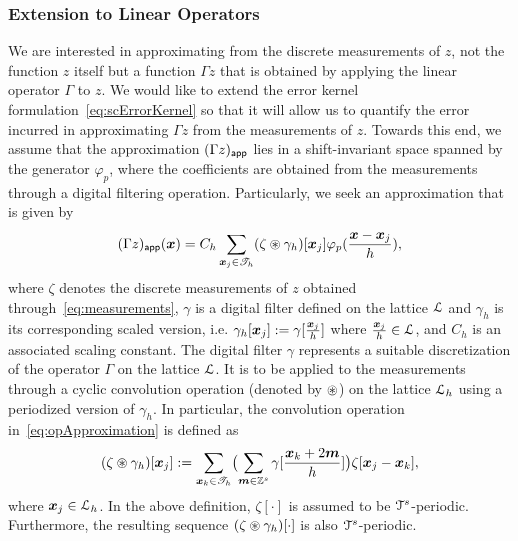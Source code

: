 \subsubsection{Extension to Linear Operators}
We are interested in approximating from the discrete measurements of $z$, not the function $z$ itself but a function $\Gamma z$ that is obtained by applying the linear operator $\Gamma$ to $z$. 
We would like to extend the error kernel formulation~\eqref{eq:scErrorKernel} so that it will allow us to quantify the error incurred in approximating $\Gamma z$ from the measurements of $z$. 
Towards this end, we assume that the approximation $(\Gamma z)_{\mathsf{app}}$ lies in a shift-invariant space spanned by the generator $\varphi_p$, where the coefficients are obtained from the measurements through a digital filtering operation. 
Particularly, we seek an approximation that is given by
\begin{equation}
\appf{(\Gamma z)}(\vect{x}) = C_h \sum_{\vect{x}_j \in \pointset{T}_h} 
(\zeta \pconv \gamma_h)[\vect{x}_j]
\varphi_p(\frac{\vect{x}-\vect{x}_j}{h}),
\label{eq:opApproximation}
\end{equation}
where $\zeta$ denotes the discrete measurements of $z$ obtained through~\eqref{eq:measurements}, $\gamma$ is a digital filter defined on the lattice $\mathcal{L}$ and $\gamma_h$ is its corresponding scaled version, i.e. $\gamma_h[\boldsymbol{x}_j] := \gamma[\tfrac{\boldsymbol{x}_j}{h}]$ where $\tfrac{\boldsymbol{x}_j}{h} \in \mathcal{L}$, and $C_h$ is an associated scaling constant. 
The digital filter $\gamma$ represents a suitable discretization of the operator $\Gamma$ on the lattice $\mathcal{L}$. 
It is to be applied to the measurements through a cyclic convolution operation (denoted by $\circledast$) on the lattice $\mathcal{L}_h$ using a periodized version of $\gamma_h$. 
In particular, the convolution operation in~\eqref{eq:opApproximation} is defined as
\begin{equation}
  (\zeta \pconv \gamma_h)[\vect{x}_j] :=
  \sum_{\vect{x}_k \in \pointset{T}_h}
  \bigl(
    \sum_{\vect{m} \in \ints^s}\gamma[\frac{\vect{x}_k + 2\vect{m}}{h}]
  \bigr)
  \zeta[\vect{x}_j - \vect{x}_k],
\label{eq:cyclicConvolution}
\end{equation}
where $\boldsymbol{x}_j \in \mathcal{L}_h$. 
In the above definition, $\zeta[\cdot]$ is assumed to be $\mathcal{T}^s$-periodic.
Furthermore, the resulting sequence $(\zeta \circledast \gamma_h)[\cdot]$ is also $\mathcal{T}^s$-periodic.

